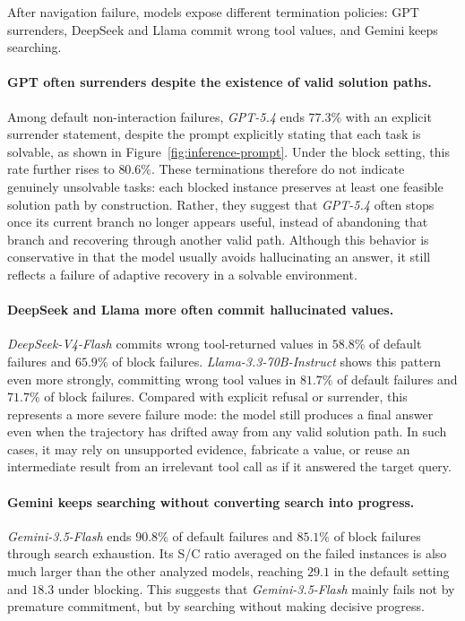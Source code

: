 \begin{takeaway}
After navigation failure, models expose different termination policies: GPT surrenders, DeepSeek and Llama commit wrong tool values, and Gemini keeps searching.
\end{takeaway}

\paragraph{GPT often surrenders despite the existence of valid solution paths.}
Among default non-interaction failures, \textit{GPT-5.4} ends $77.3\%$ with an explicit surrender statement, despite the prompt explicitly stating that each task is solvable, as shown in Figure~\ref{fig:inference-prompt}. Under the block setting, this rate further rises to $80.6\%$. These terminations therefore do not indicate genuinely unsolvable tasks: each blocked instance preserves at least one feasible solution path by construction. Rather, they suggest that \textit{GPT-5.4} often stops once its current branch no longer appears useful, instead of abandoning that branch and recovering through another valid path. Although this behavior is conservative in that the model usually avoids hallucinating an answer, it still reflects a failure of adaptive recovery in a solvable environment.

\paragraph{DeepSeek and Llama more often commit hallucinated values.}
\textit{DeepSeek-V4-Flash} commits wrong tool-returned values in $58.8\%$ of default failures and $65.9\%$ of block failures.
\textit{Llama-3.3-70B-Instruct} shows this pattern even more strongly, committing wrong tool values in $81.7\%$ of default failures and $71.7\%$ of block failures.
Compared with explicit refusal or surrender, this represents a more severe failure mode: the model still produces a final answer even when the trajectory has drifted away from any valid solution path. 
In such cases, it may rely on unsupported evidence, fabricate a value, or reuse an intermediate result from an irrelevant tool call as if it answered the target query.


\paragraph{Gemini keeps searching without converting search into progress.}
\textit{Gemini-3.5-Flash} ends $90.8\%$ of default failures and $85.1\%$ of block failures through search exhaustion.
Its S/C ratio averaged on the failed instances is also much larger than the other analyzed models, reaching $29.1$ in the default setting and $18.3$ under blocking.
This suggests that \textit{Gemini-3.5-Flash} mainly fails not by premature commitment, but by searching without making decisive progress.

